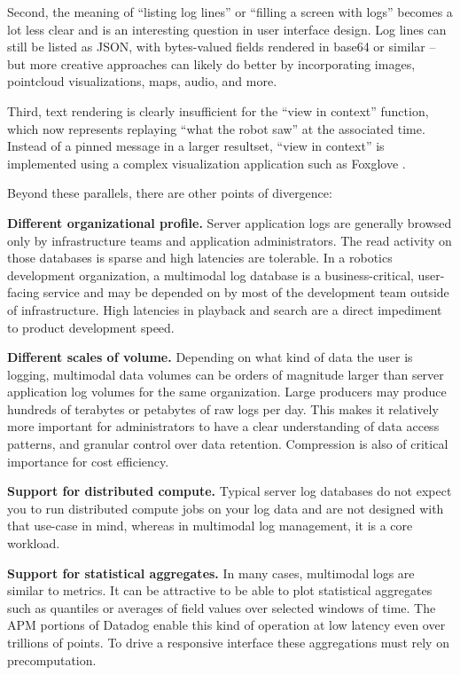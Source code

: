 \documentclass[9pt,twocolumn]{article}
\newcommand{\q}[1]{``#1''}
\begin{document}
    Second, the meaning of \q{listing log lines} or \q{filling a screen with
    logs} becomes a lot less clear and is an interesting question in user
    interface design. Log lines can still be listed as JSON, with bytes-valued
    fields rendered in base64 or similar – but more creative approaches can
    likely do better by incorporating images, pointcloud visualizations, maps,
    audio, and more.


    Third, text rendering is clearly insufficient for the \q{view in context}
    function, which now represents replaying \q{what the robot saw} at the
    associated time. Instead of a pinned message in a larger resultset, \q{view
    in context} is implemented using a complex visualization application such as
    Foxglove \cite{foxglove}.

    Beyond these parallels, there are other points of divergence:

    \textbf{Different organizational profile.} Server application logs are
    generally browsed only by infrastructure teams and application
    administrators. The read activity on those databases is sparse and high
    latencies are tolerable. In a robotics development organization, a
    multimodal log database is a business-critical, user-facing service and
    may be depended on by most of the development team outside of
    infrastructure. High latencies in playback and search are a direct
    impediment to product development speed.

    \textbf{Different scales of volume.} Depending on what kind of data the
    user is logging, multimodal data volumes can be orders of magnitude larger
    than server application log volumes for the same organization. Large
    producers may produce hundreds of terabytes or petabytes of raw logs per
    day. This makes it relatively more important for administrators to have a
    clear understanding of data access patterns, and granular control over data
    retention. Compression is also of critical importance for cost efficiency.

    \textbf{Support for distributed compute.} Typical server log databases do
    not expect you to run distributed compute jobs on your log data and are not
    designed with that use-case in mind, whereas in multimodal log management,
    it is a core workload.

    \textbf{Support for statistical aggregates.} In many cases, multimodal logs
    are similar to metrics. It can be attractive to be able to plot statistical
    aggregates such as quantiles or averages of field values over selected
    windows of time. The APM portions of Datadog enable this kind of operation
    at low latency even over trillions of points. To drive a responsive
    interface these aggregations must rely on precomputation.
\end{document}
